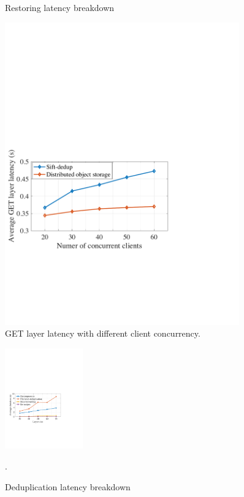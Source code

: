 \begin{figure}[t]
\begin{minipage}{0.3\textwidth}
	\caption{Restoring latency breakdown}
	\label{fig:eval-restoringbreakdown}
\end{minipage}
	\begin{minipage}{0.3\textwidth}
		\centering
		\includegraphics[width=0.9\textwidth]{graphs/clientscale.pdf}
		\caption{GET layer latency with different client concurrency.}
		\label{fig:eval-clientscale}
	\end{minipage}%
\end{figure}

\begin{figure}[t]
	\centering
	\includegraphics[width=0.3\textwidth]{graphs/dedupbreakdown.pdf}
	\caption{Deduplication latency breakdown}.
	\label{fig:eval-dedupbreakdown}
	
\end{figure}